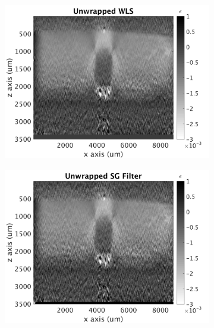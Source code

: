 \begin{figure}[h]
	\centering
    \begin{subfigure}{0.49\textwidth}
    	\centering
	    \includegraphics[width=\textwidth]{appendix_figs/wls_fr100_lr0.png}
    \end{subfigure}
    \begin{subfigure}{0.49\textwidth}
    	\centering
        \includegraphics[width=\textwidth]{appendix_figs/uwsg_fr100_lr0.png}
    \end{subfigure}
    \\
    \begin{subfigure}{0.49\textwidth}
    	\centering

\end{subfigure}
\end{figure}
